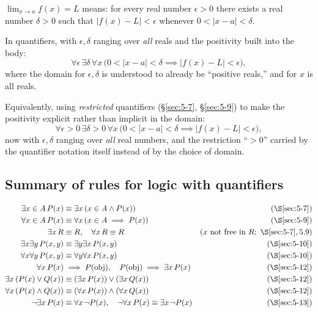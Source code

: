 \documentclass[11pt]{article}
\begin{document}
\bigskip
\begin{example}
$\lim_{x\to a} f(x) = L$ means: for every real number $\epsilon>0$ there exists a real number $\delta>0$ such that $|f(x)-L|<\epsilon$ whenever $0<|x-a|<\delta$.

In quantifiers, with $\epsilon,\delta$ ranging over \emph{all} reals and the positivity built into the body:
\[
\forall\epsilon\,\exists\delta\,\forall x\,\Big(0<|x-a|<\delta \implies |f(x)-L|<\epsilon\Big),
\]
where the domain for $\epsilon,\delta$ is understood to already be ``positive reals,'' and for $x$ is all reals.

Equivalently, using \emph{restricted} quantifiers (\S\ref{sec:5-7}, \S\ref{sec:5-9}) to make the positivity explicit rather than implicit in the domain:
\[
\forall\epsilon>0\,\exists\delta>0\,\forall x\,\Big(0<|x-a|<\delta \implies |f(x)-L|<\epsilon\Big),
\]
now with $\epsilon,\delta$ ranging over \emph{all} real numbers, and the restriction ``$>0$'' carried by the quantifier notation itself instead of by the choice of domain.
\end{example}

\subsection{Summary of rules for logic with quantifiers}
\label{sec:5-14}

\begin{note}
\begin{align*}
\exists x\in A\, P(x) &\equiv \exists x\,(x\in A \wedge P(x)) & \text{(\S\ref{sec:5-7})}\\
\forall x\in A\, P(x) &\equiv \forall x\,(x\in A \implies P(x)) & \text{(\S\ref{sec:5-9})}\\
\exists x\, R &\equiv R, \quad \forall x\, R \equiv R & (x \text{ not free in } R;\ \S\ref{sec:5-7},5.9)\\
\exists x\exists y\, P(x,y) &\equiv \exists y\exists x\, P(x,y) & \text{(\S\ref{sec:5-10})}\\
\forall x\forall y\, P(x,y) &\equiv \forall y\forall x\, P(x,y) & \text{(\S\ref{sec:5-10})}\\
\forall x\, P(x) &\implies P(\mathrm{obj}), \quad P(\mathrm{obj}) \implies \exists x\, P(x) & \text{(\S\ref{sec:5-12})}\\
\exists x\,(P(x)\vee Q(x)) &\equiv (\exists x\,P(x))\vee(\exists x\,Q(x)) & \text{(\S\ref{sec:5-12})}\\
\forall x\,(P(x)\wedge Q(x)) &\equiv (\forall x\,P(x))\wedge(\forall x\,Q(x)) & \text{(\S\ref{sec:5-12})}\\
\neg\exists x\, P(x) &\equiv \forall x\,\neg P(x), \quad \neg\forall x\, P(x) \equiv \exists x\,\neg P(x) & \text{(\S\ref{sec:5-13})}
\end{align*}
\end{note}
\end{document}

